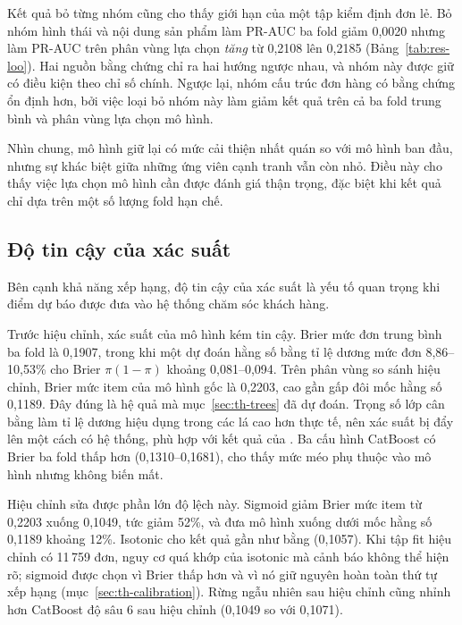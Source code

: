 \documentclass[12pt,a4paper]{report}
\begin{document}
Kết quả bỏ từng nhóm cũng cho thấy giới hạn của một tập kiểm định đơn lẻ. Bỏ nhóm hình thái và nội dung sản phẩm làm PR-AUC ba fold giảm 0,0020 nhưng làm PR-AUC trên phân vùng lựa chọn \emph{tăng} từ 0,2108 lên 0,2185 (Bảng~\ref{tab:res-loo}). Hai nguồn bằng chứng chỉ ra hai hướng ngược nhau, và nhóm này được giữ có điều kiện theo chỉ số chính. Ngược lại, nhóm cấu trúc đơn hàng có bằng chứng ổn định hơn, bởi việc loại bỏ nhóm này làm giảm kết quả trên cả ba fold trung bình và phân vùng lựa chọn mô hình.

Nhìn chung, mô hình giữ lại có mức cải thiện nhất quán so với mô hình ban đầu, nhưng sự khác biệt giữa những ứng viên cạnh tranh vẫn còn nhỏ. Điều này cho thấy việc lựa chọn mô hình cần được đánh giá thận trọng, đặc biệt khi kết quả chỉ dựa trên một số lượng fold hạn chế.

\subsection{Độ tin cậy của xác suất}\label{sec:analysis-calibration}

Bên cạnh khả năng xếp hạng, độ tin cậy của xác suất là yếu tố quan trọng khi điểm dự báo được đưa vào hệ thống chăm sóc khách hàng.

Trước hiệu chỉnh, xác suất của mô hình kém tin cậy. Brier mức đơn trung bình ba fold là 0,1907, trong khi một dự đoán hằng số bằng tỉ lệ dương mức đơn 8,86--10,53\% cho Brier $\pi(1-\pi)$ khoảng 0,081--0,094. Trên phân vùng so sánh hiệu chỉnh, Brier mức item của mô hình gốc là 0,2203, cao gần gấp đôi mốc hằng số 0,1189. Đây đúng là hệ quả mà mục~\ref{sec:th-trees} đã dự đoán. Trọng số lớp cân bằng làm tỉ lệ dương hiệu dụng trong các lá cao hơn thực tế, nên xác suất bị đẩy lên một cách có hệ thống, phù hợp với kết quả của \textcite{vandengoorbergh2022}. Ba cấu hình CatBoost có Brier ba fold thấp hơn (0,1310--0,1681), cho thấy mức méo phụ thuộc vào mô hình nhưng không biến mất.

Hiệu chỉnh sửa được phần lớn độ lệch này. Sigmoid giảm Brier mức item từ 0,2203 xuống 0,1049, tức giảm 52\%, và đưa mô hình xuống dưới mốc hằng số 0,1189 khoảng 12\%. Isotonic cho kết quả gần như bằng (0,1057). Khi tập fit hiệu chỉnh có 11\,759 đơn, nguy cơ quá khớp của isotonic mà \textcite{niculescumizil2005} cảnh báo không thể hiện rõ; sigmoid được chọn vì Brier thấp hơn và vì nó giữ nguyên hoàn toàn thứ tự xếp hạng (mục~\ref{sec:th-calibration}). Rừng ngẫu nhiên sau hiệu chỉnh cũng nhỉnh hơn CatBoost độ sâu 6 sau hiệu chỉnh (0,1049 so với 0,1071).
\end{document}
